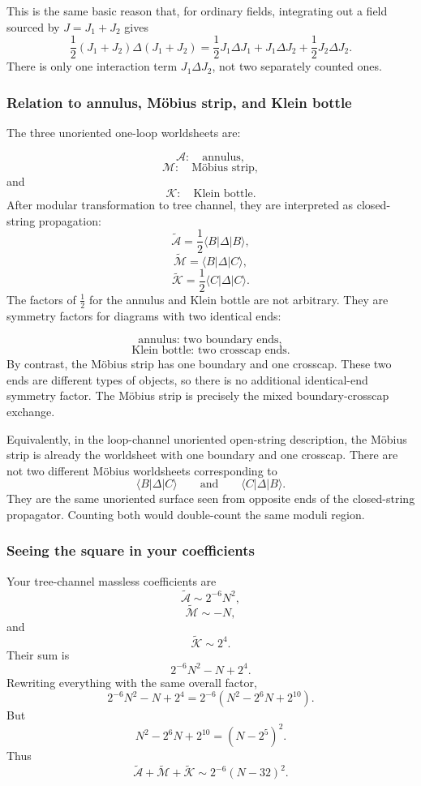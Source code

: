 \documentclass[
  10pt,
  a4paper,
  openany]{book}
\begin{document}
This is the same basic reason that, for ordinary fields, integrating out
a field sourced by \(J=J_1+J_2\) gives \[
\frac{1}{2}(J_1+J_2)\Delta(J_1+J_2)
=
\frac{1}{2}J_1\Delta J_1
+
J_1\Delta J_2
+
\frac{1}{2}J_2\Delta J_2.
\] There is only one interaction term \(J_1\Delta J_2\), not two
separately counted ones.

\subsubsection{Relation to annulus, Möbius strip, and Klein
bottle}\label{relation-to-annulus-muxf6bius-strip-and-klein-bottle}

The three unoriented one-loop worldsheets are:

\[
\mathcal A:\quad
\text{annulus},
\] \[
\mathcal M:\quad
\text{Möbius strip},
\] and \[
\mathcal K:\quad
\text{Klein bottle}.
\] After modular transformation to tree channel, they are interpreted as
closed-string propagation: \[
\tilde{\mathcal A}
=
\frac{1}{2}\langle B|\Delta|B\rangle,
\] \[
\tilde{\mathcal M}
=
\langle B|\Delta|C\rangle,
\] \[
\tilde{\mathcal K}
=
\frac{1}{2}\langle C|\Delta|C\rangle.
\] The factors of \(\frac{1}{2}\) for the annulus and Klein bottle are
not arbitrary. They are symmetry factors for diagrams with two identical
ends:

\[
\text{annulus: two boundary ends},
\] \[
\text{Klein bottle: two crosscap ends}.
\] By contrast, the Möbius strip has one boundary and one crosscap.
These two ends are different types of objects, so there is no additional
identical-end symmetry factor. The Möbius strip is precisely the mixed
boundary-crosscap exchange.

Equivalently, in the loop-channel unoriented open-string description,
the Möbius strip is already the worldsheet with one boundary and one
crosscap. There are not two different Möbius worldsheets corresponding
to \[
\langle B|\Delta|C\rangle
\qquad
\text{and}
\qquad
\langle C|\Delta|B\rangle.
\] They are the same unoriented surface seen from opposite ends of the
closed-string propagator. Counting both would double-count the same
moduli region.

\subsubsection{Seeing the square in your
coefficients}\label{seeing-the-square-in-your-coefficients}

Your tree-channel massless coefficients are \[
\tilde{\mathcal A}
\sim
2^{-6}N^2,
\] \[
\tilde{\mathcal M}
\sim
-N,
\] and \[
\tilde{\mathcal K}
\sim
2^4.
\] Their sum is \[
2^{-6}N^2-N+2^4.
\] Rewriting everything with the same overall factor, \[
2^{-6}N^2-N+2^4
=
2^{-6}
\left(
N^2-2^6N+2^{10}
\right).
\] But \[
N^2-2^6N+2^{10}
=
(N-2^5)^2.
\] Thus \[
\tilde{\mathcal A}
+
\tilde{\mathcal M}
+
\tilde{\mathcal K}
\sim
2^{-6}(N-32)^2.
\]
\end{document}
